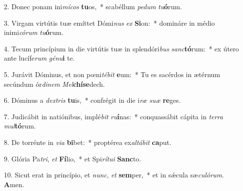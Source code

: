 2. Donec ponam ini\textit{mí}\textit{cos} \textbf{tu}os,~*  scabéllum \textit{pe}\textit{dum} \textit{tu}\textbf{ó}rum.\

3. Virgam virtútis tuæ emíttet Dómi\textit{nus} \textit{ex} \textbf{Si}on:~*  domináre in médio inimi\textit{có}\textit{rum} \textit{tu}\textbf{ó}rum.\

4. Tecum princípium in die virtútis tuæ in splendóri\textit{bus} \textit{sanc}\textbf{tó}rum:~*  ex útero ante lucífe\textit{rum} \textit{gé}\textit{nu}\textbf{i} te.\

5. Jurávit Dóminus, et non pœni\textit{té}\textit{bit} \textbf{e}um:~*  Tu es sacérdos in ætérnum secúndum ór\textit{di}\textit{nem} \textit{Mel}\textbf{chí}\textbf{se}dech.\

6. Dóminus a \textit{dex}\textit{tris} \textbf{tu}is,~*  confrégit in die i\textit{ræ} \textit{su}\textit{æ} \textbf{re}ges.\

7. Judicábit in natiónibus, implé\textit{bit} \textit{ru}\textbf{í}nas:~*  conquassábit cápita in \textit{ter}\textit{ra} \textit{mul}\textbf{tó}rum.\

8. De torrénte in \textit{vi}\textit{a} \textbf{bi}bet:~*  proptérea ex\textit{al}\textit{tá}\textit{bit} \textbf{ca}put.\

9. Glória Pa\textit{tri}, \textit{et} \textbf{Fí}lio,~*  et Spi\textit{rí}\textit{tu}\textit{i} \textbf{Sanc}to.\

10. Sicut erat in princípio, et \textit{nunc}, \textit{et} \textbf{sem}per,~*  et in sǽcula sæ\textit{cu}\textit{ló}\textit{rum}. \textbf{A}men.\

